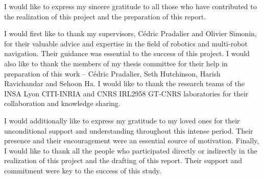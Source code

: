 
\begin{acknowledgments}

	I would like to express my sincere gratitude to all those who have contributed to the realization of this project and the preparation of this report.

	I would first like to thank my supervisors, Cédric Pradalier and Olivier Simonin, for their valuable advice and expertise in the field of robotics and multi-robot navigation.
	Their guidance was essential to the success of this project.
	I would also like to thank the members of my thesis committee for their help in preparation of this work -- Cédric Pradalier, Seth Hutchinson, Harish Ravichandar and Sehoon Ha.
	I would like to thank the research teams of the INSA Lyon CITI-INRIA and CNRS IRL2958 GT-CNRS laboratories for their collaboration and knowledge sharing.

	I would additionally like to express my gratitude to my loved ones for their unconditional support and understanding throughout this intense period.
	Their presence and their encouragement were an essential source of motivation.
	Finally, I would like to thank all the people who participated directly or indirectly in the realization of this project and the drafting of this report.
	Their support and commitment were key to the success of this study.

\end{acknowledgments}
